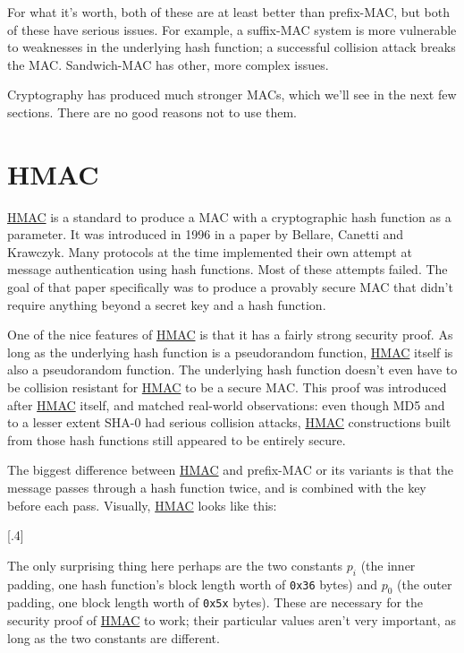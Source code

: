 \documentclass[11pt,ebook,table,dvipsnames]{memoir}
\begin{document}
For what it's worth, both of these are at least better than
prefix-MAC, but both of these have serious issues. For example, a
suffix-MAC system is more vulnerable to weaknesses in the underlying
hash function; a successful collision attack breaks the MAC.
Sandwich-MAC has other, more complex issues.

Cryptography has produced much stronger MACs, which we'll see in the
next few sections. There are no good reasons not to use them.
\section{\label{HMAC}HMAC}
\label{sec-2-7-4}

\hyperref[HMAC]{HMAC} is a standard to produce a MAC with a cryptographic hash function
as a parameter. It was introduced in 1996 in a paper by Bellare,
Canetti and Krawczyk. Many protocols at the time implemented their own
attempt at message authentication using hash functions. Most of these
attempts failed. The goal of that paper specifically was to produce a
provably secure MAC that didn't require anything beyond a secret key
and a hash function.

One of the nice features of \hyperref[HMAC]{HMAC} is that it has a fairly strong
security proof. As long as the underlying hash function is a
pseudorandom function, \hyperref[HMAC]{HMAC} itself is also a pseudorandom function.
The underlying hash function doesn't even have to be collision
resistant for \hyperref[HMAC]{HMAC} to be a secure MAC. \cite{hmac:proof2} This proof
was introduced after \hyperref[HMAC]{HMAC} itself, and matched real-world observations:
even though MD5 and to a lesser extent SHA-0 had serious collision
attacks, \hyperref[HMAC]{HMAC} constructions built from those hash functions still
appeared to be entirely secure.

The biggest difference between \hyperref[HMAC]{HMAC} and prefix-MAC or its variants is
that the message passes through a hash function twice, and is combined
with the key before each pass. Visually, \hyperref[HMAC]{HMAC} looks like this:

[.4]

The only surprising thing here perhaps are the two constants $p_i$
(the inner padding, one hash function's block length worth of \verb~0x36~
bytes) and $p_0$ (the outer padding, one block length worth of \verb~0x5x~
bytes). These are necessary for the security proof of \hyperref[HMAC]{HMAC} to work;
their particular values aren't very important, as long as the two
constants are different.
\end{document}
